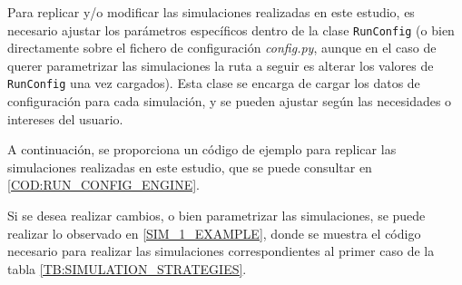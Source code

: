Para replicar y/o modificar las simulaciones realizadas en este estudio, es necesario ajustar los parámetros específicos dentro de
la clase \texttt{RunConfig} (o bien directamente sobre el fichero de configuración \textit{config.py}, aunque en el caso de querer parametrizar
las simulaciones la ruta a seguir es alterar los valores de \texttt{RunConfig} una vez cargados).
Esta clase se encarga de cargar los datos de configuración para cada simulación, y se pueden ajustar según las necesidades o intereses del usuario.

A continuación, se proporciona un código de ejemplo para replicar las simulaciones realizadas en este estudio, que se puede consultar en
\ref{COD:RUN_CONFIG_ENGINE}.


Si se desea realizar cambios, o bien parametrizar las simulaciones, se puede realizar lo observado en \ref{SIM_1_EXAMPLE},
donde se muestra el código necesario para realizar las simulaciones correspondientes al primer caso de la tabla
\ref{TB:SIMULATION_STRATEGIES}.

